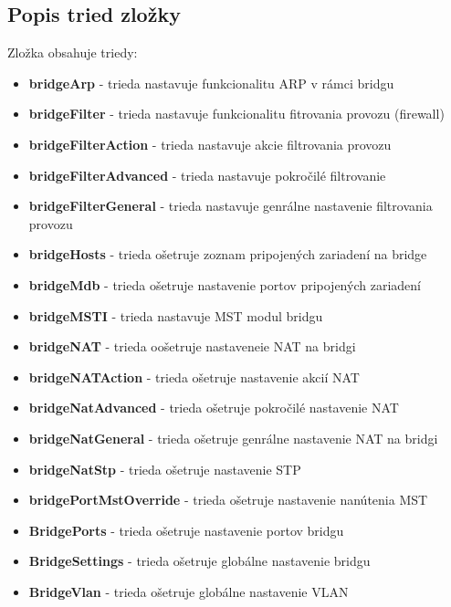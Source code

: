 \subsection{Popis tried zložky}
\label{sec:bridgechap}
Zložka obsahuje triedy:
\begin{itemize}
\item \textbf{bridgeArp} - trieda nastavuje funkcionalitu ARP v rámci bridgu
\item \textbf{bridgeFilter} - trieda nastavuje funkcionalitu fitrovania provozu (firewall)
\item \textbf{bridgeFilterAction} - trieda nastavuje akcie filtrovania provozu
\item \textbf{bridgeFilterAdvanced} - trieda nastavuje pokročilé filtrovanie
\item \textbf{bridgeFilterGeneral} - trieda nastavuje genrálne nastavenie filtrovania provozu
\item \textbf{bridgeHosts} - trieda ošetruje zoznam pripojených zariadení na bridge
\item \textbf{bridgeMdb} - trieda ošetruje nastavenie portov pripojených zariadení
\item \textbf{bridgeMSTI} - trieda nastavuje MST modul bridgu
\item \textbf{bridgeNAT} - trieda oošetruje nastaveneie NAT na bridgi
\item \textbf{bridgeNATAction} - trieda ošetruje nastavenie akcií NAT
\item \textbf{bridgeNatAdvanced} - trieda ošetruje pokročilé nastavenie NAT
\item \textbf{bridgeNatGeneral} - trieda ošetruje genrálne nastavenie NAT na bridgi
\item \textbf{bridgeNatStp} - trieda ošetruje nastavenie STP
\item \textbf{bridgePortMstOverride} - trieda ošetruje nastavenie nanútenia MST
\item \textbf{BridgePorts} - trieda ošetruje nastavenie portov bridgu
\item \textbf{BridgeSettings} - trieda ošetruje globálne nastavenie  bridgu  
\item \textbf{BridgeVlan} - trieda ošetruje globálne nastavenie VLAN

\end{itemize}
